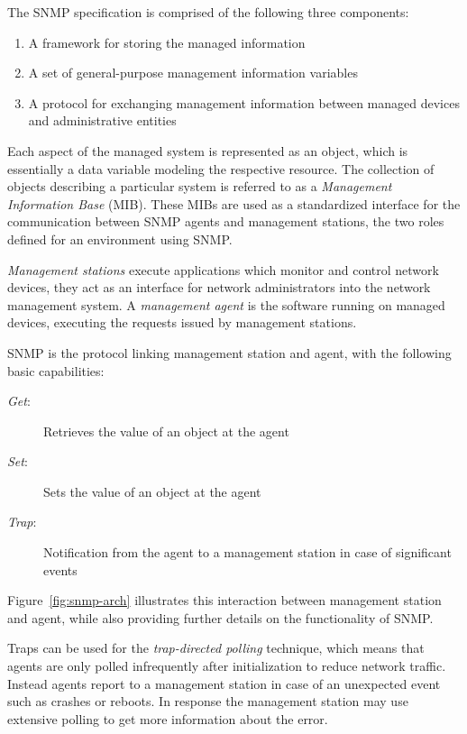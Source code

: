 \documentclass[conference]{IEEEtran}
\begin{document}
The SNMP specification is comprised of the following three components\cite{Stallings1998}:

\begin{enumerate}
  \item A framework for storing the managed information
  \item A set of general-purpose management information variables
  \item A protocol for exchanging management information between managed devices and administrative entities
\end{enumerate}


Each aspect of the managed system is represented as an object, which is essentially a data variable modeling the respective resource. The collection of objects describing a particular system is referred to as a \textit{Management Information Base} (MIB)\cite{rfc3418,rfc1213}. These MIBs are used as a standardized interface for the communication between SNMP agents and management stations, the two roles defined for an environment using SNMP. 

\textit{Management stations} execute applications which monitor and control network devices, they act as an interface for network administrators into the network management system. A \textit{management agent} is the software running on managed devices, executing the requests issued by management stations\cite{rfc1067}. 

SNMP is the protocol linking management station and agent, with the following basic capabilities:

\begin{description}
    \item[\textit{Get}:] Retrieves the value of an object at the agent
    \item [\textit{Set}:] Sets the value of an object at the agent
    \item [\textit{Trap}:] Notification from the agent to a management station in case of significant events
  \end{description}  

Figure~\ref{fig:snmp-arch} illustrates this interaction between management station and agent, while also providing further details on the functionality of SNMP. 

Traps can be used for the \textit{trap-directed polling} technique, which means that agents are only polled infrequently after initialization to reduce network traffic. Instead agents report to a management station in case of an unexpected event such as crashes or reboots. In response the management station may use extensive polling to get more information about the error.
\end{document}

